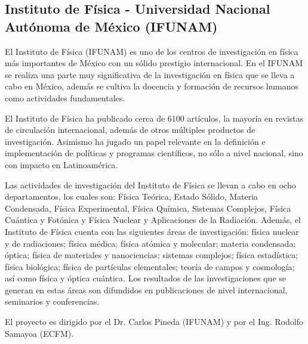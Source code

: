 \subsection{Instituto de Física - Universidad Nacional Autónoma de México (IFUNAM)}
El Instituto de Física (IFUNAM) es uno de los centros de investigación en física más importantes de México con un sólido prestigio internacional. En el IFUNAM se realiza una parte muy significativa de la investigación en física que se lleva a cabo en México, además se cultiva la docencia y formación de recursos humanos como actividades fundamentales.

El Instituto de Física ha publicado cerca de 6100 artículos, la mayoría en revistas de circulación internacional, además de otros múltiples productos de investigación. Asimismo ha jugado un papel relevante en la definición e implementación de políticas y programas científicos, no sólo a nivel nacional, sino con impacto en Latinoamérica.

 

Las actividades de investigación del Instituto de Física se llevan a cabo en ocho departamentos, los cuales son: Física Teórica, Estado Sólido, Materia Condensada, Física Experimental, Física Química, Sistemas Complejos, Física Cuántica y Fotónica y Física Nuclear y Aplicaciones de la Radiación. Además, el Instituto de Física cuenta con las siguientes áreas de investigación: física nuclear y de radiaciones; física médica; física atómica y molecular; materia condensada; óptica; física de materiales y nanociencias; sistemas complejos; física estadística; física biológica; física de partículas elementales; teoría de campos y cosmología; así como física y óptica cuántica. Los resultados de las investigaciones que se generan en estas áreas son difundidos en publicaciones de nivel internacional, seminarios y conferencias.




El proyecto es dirigido por el Dr. Carlos Pineda (IFUNAM) y por el Ing. Rodolfo Samayoa (ECFM).
